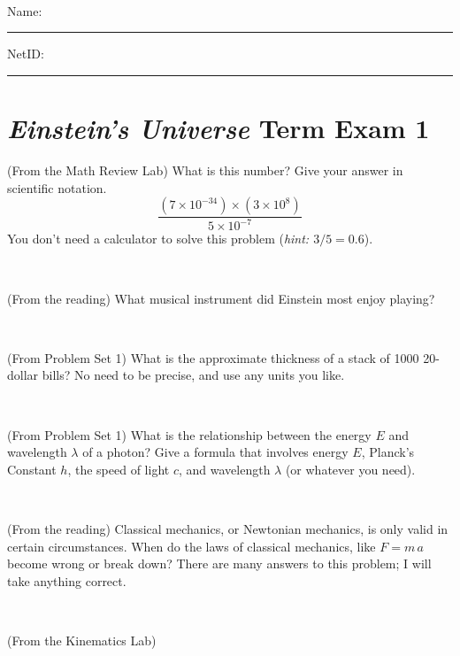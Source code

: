\documentclass[12pt, letterpaper]{article}
\begin{document}
\vfill ~


\cleardoublepage



\noindent
Name: \rule[-1ex]{0.60\textwidth}{0.1pt}
NetID: \rule[-1ex]{0.20\textwidth}{0.1pt}

\section*{\textsl{Einstein's Universe} Term Exam 1}
\setcounter{problem}{1}


\begin{problem} (From the Math Review Lab)
What is this number? Give your answer in scientific notation.
$$
\frac{(7\times10^{-34})\times(3\times10^8)}{5\times10^{-7}}
$$
You don't need a calculator to solve this problem (\textit{hint: $3/5=0.6$}).
\end{problem}


\vfill ~

\begin{problem} (From the reading)
What musical instrument did Einstein most enjoy playing?
\end{problem}


\vfill ~

\begin{problem} (From Problem Set 1)
What is the approximate thickness of a stack of 1000 20-dollar bills?
No need to be precise, and use any units you like.
\end{problem}


\vfill ~

\begin{problem} (From Problem Set 1)
What is the relationship between the energy $E$ and wavelength
$\lambda$ of a photon? Give a formula that involves energy $E$,
Planck's Constant $h$, the speed of light $c$, and wavelength
$\lambda$ (or whatever you need).
\end{problem}

\vfill ~


\clearpage


\begin{problem} (From the reading)
Classical mechanics, or Newtonian mechanics, is only valid in certain
circumstances. When do the laws of classical mechanics, like $F =
m\,a$ become wrong or break down? There are many answers to this
problem; I will take anything correct.
\end{problem}


\vfill ~

\begin{problem} (From the Kinematics Lab)

\end{problem}
\end{document}
